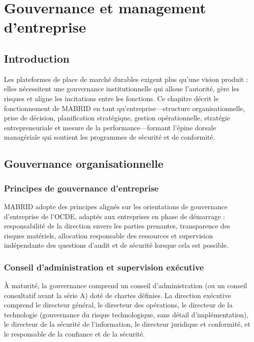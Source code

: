 \chapter{Gouvernance et management d'entreprise}
\label{ch:governance}

\section{Introduction}

Les plateformes de place de marché durables exigent plus qu'une vision produit : elles nécessitent une gouvernance institutionnelle qui alloue l'autorité, gère les risques et aligne les incitations entre les fonctions. Ce chapitre décrit le fonctionnement de MABRID en tant qu'entreprise---structure organisationnelle, prise de décision, planification stratégique, gestion opérationnelle, stratégie entrepreneuriale et mesure de la performance---formant l'épine dorsale managériale qui soutient les programmes de sécurité et de conformité.

\section{Gouvernance organisationnelle}

\subsection{Principes de gouvernance d'entreprise}

MABRID adopte des principes alignés sur les orientations de gouvernance d'entreprise de l'OCDE, adaptés aux entreprises en phase de démarrage \parencite{oecd2015governance} : responsabilité de la direction envers les parties prenantes, transparence des risques matériels, allocation responsable des ressources et supervision indépendante des questions d'audit et de sécurité lorsque cela est possible.

\subsection{Conseil d'administration et supervision exécutive}

À maturité, la gouvernance comprend un conseil d'administration (ou un conseil consultatif avant la série A) doté de chartes définies. La direction exécutive comprend le directeur général, le directeur des opérations, le directeur de la technologie (gouvernance du risque technologique, sans détail d'implémentation), le directeur de la sécurité de l'information, le directeur juridique et conformité, et le responsable de la confiance et de la sécurité.

